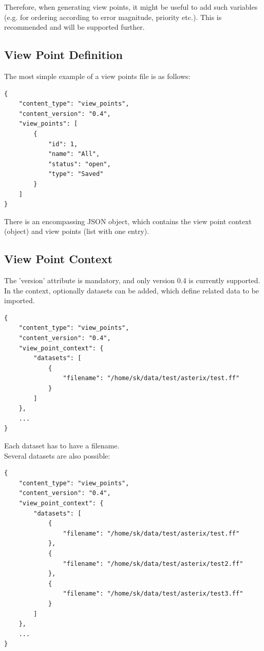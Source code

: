 Therefore, when generating view points, it might be useful to add such variables (e.g. for ordering according to error magnitude, priority etc.). This is recommended and will be supported further. \\
 
\subsection{View Point Definition}
 
The most simple example of a view points file is as follows:

\begin{lstlisting}[basicstyle=\small\ttfamily]
{
    "content_type": "view_points",
    "content_version": "0.4",
    "view_points": [
        {
            "id": 1,
            "name": "All",
            "status": "open",
            "type": "Saved"
        }
    ]
}
\end{lstlisting}

There is an encompassing JSON object, which contains the view point context (object) and view points (list with one entry). \\

\subsection{View Point Context}

The 'version' attribute is mandatory, and only version 0.4 is currently supported. \\

In the context, optionally datasets can be added, which define related data to be imported.

\begin{lstlisting}[basicstyle=\small\ttfamily]
{
    "content_type": "view_points",
    "content_version": "0.4",
    "view_point_context": {
        "datasets": [
            {
                "filename": "/home/sk/data/test/asterix/test.ff"
            }
        ]
    },
    ...
}
\end{lstlisting}

Each dataset has to have a filename. \\

Several datasets are also possible:
\begin{lstlisting}[basicstyle=\small\ttfamily]
{
    "content_type": "view_points",
    "content_version": "0.4",
    "view_point_context": {
        "datasets": [
            {
                "filename": "/home/sk/data/test/asterix/test.ff"
            },
            {
                "filename": "/home/sk/data/test/asterix/test2.ff"
            },
            {
                "filename": "/home/sk/data/test/asterix/test3.ff"
            }
        ]
    },
    ...
}
\end{lstlisting}

